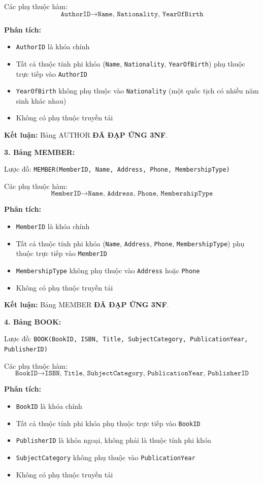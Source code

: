 \documentclass[12pt,a4paper]{article}
\begin{document}
Các phụ thuộc hàm:
$$ \texttt{AuthorID} \rightarrow \texttt{Name, Nationality, YearOfBirth} $$

\textbf{Phân tích:}
\begin{itemize}
    \item \texttt{AuthorID} là khóa chính
    \item Tất cả thuộc tính phi khóa (\texttt{Name}, \texttt{Nationality}, \texttt{YearOfBirth}) phụ thuộc trực tiếp vào \texttt{AuthorID}
    \item \texttt{YearOfBirth} không phụ thuộc vào \texttt{Nationality} (một quốc tịch có nhiều năm sinh khác nhau)
    \item Không có phụ thuộc truyền tải
\end{itemize}

\textbf{Kết luận:} Bảng AUTHOR \textbf{ĐÃ ĐẠP ỨNG 3NF}.

\vspace{0.3cm}

\textbf{3. Bảng MEMBER:}

Lược đồ: \texttt{MEMBER(MemberID, Name, Address, Phone, MembershipType)}

Các phụ thuộc hàm:
$$ \texttt{MemberID} \rightarrow \texttt{Name, Address, Phone, MembershipType} $$

\textbf{Phân tích:}
\begin{itemize}
    \item \texttt{MemberID} là khóa chính
    \item Tất cả thuộc tính phi khóa (\texttt{Name}, \texttt{Address}, \texttt{Phone}, \texttt{MembershipType}) phụ thuộc trực tiếp vào \texttt{MemberID}
    \item \texttt{MembershipType} không phụ thuộc vào \texttt{Address} hoặc \texttt{Phone}
    \item Không có phụ thuộc truyền tải
\end{itemize}

\textbf{Kết luận:} Bảng MEMBER \textbf{ĐÃ ĐẠP ỨNG 3NF}.

\vspace{0.3cm}

\textbf{4. Bảng BOOK:}

Lược đồ: \texttt{BOOK(BookID, ISBN, Title, SubjectCategory, PublicationYear, PublisherID)}

Các phụ thuộc hàm:
$$ \texttt{BookID} \rightarrow \texttt{ISBN, Title, SubjectCategory, PublicationYear, PublisherID} $$

\textbf{Phân tích:}
\begin{itemize}
    \item \texttt{BookID} là khóa chính
    \item Tất cả thuộc tính phi khóa phụ thuộc trực tiếp vào \texttt{BookID}
    \item \texttt{PublisherID} là khóa ngoại, không phải là thuộc tính phi khóa
    \item \texttt{SubjectCategory} không phụ thuộc vào \texttt{PublicationYear}
    \item Không có phụ thuộc truyền tải
\end{itemize}
\end{document}
